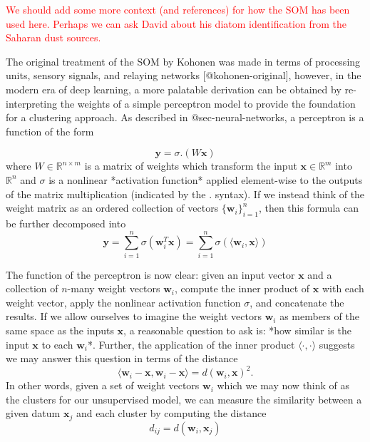 \textcolor{red}{We should add some more context (and references) for how the SOM has been used here. Perhaps we can ask David about his diatom identification from the Saharan dust sources.}

The original treatment of the SOM by Kohonen was made in terms of processing units, sensory signals, and relaying networks [@kohonen-original], however, in the modern era of deep learning, a more palatable derivation can be obtained by re-interpreting the weights of a simple perceptron model to provide the foundation for a clustering approach. As described in @sec-neural-networks, a perceptron is a function of the form

\begin{equation}
    \mathbf{y} = \sigma.\left(W\mathbf{x}\right)
\end{equation}
where $W\in\mathbb{R}^{n\times m}$ is a matrix of weights which transform the input $\mathbf{x}\in\mathbb{R}^m$ into $\mathbb{R}^n$ and $\sigma$ is a nonlinear *activation function* applied element-wise to the outputs of the matrix multiplication (indicated by the $.$ syntax). If we instead think of the weight matrix as an ordered collection of vectors $\{\mathbf{w}_i\}_{i=1}^{n}$, then this formula can be further decomposed into
\begin{equation}
    \mathbf{y} = \sum_{i=1}^n \sigma(\mathbf{w}_i^T\mathbf{x}) = \sum_{i=1}^n \sigma(\langle \mathbf{w}_i, \mathbf{x} \rangle)
\end{equation}

The function of the perceptron is now clear: given an input vector $\mathbf{x}$ and a collection of $n$-many weight vectors $\mathbf{w}_i$, compute the inner product of $\mathbf{x}$ with each weight vector, apply the nonlinear activation function $\sigma$, and concatenate the results. If we allow ourselves to imagine the weight vectors $\mathbf{w}_i$ as members of the same space as the inputs $\mathbf{x}$, a reasonable question to ask is: *how similar is the input $\mathbf{x}$ to each $\mathbf{w}_i$*. Further, the application of the inner product $\langle \cdot,\cdot \rangle$ suggests we may answer this question in terms of the distance
\begin{equation}
    \langle \mathbf{w}_i-\mathbf{x},  \mathbf{w}_i-\mathbf{x}\rangle = d(\mathbf{w}_i, \mathbf{x})^2.
\end{equation}
In other words, given a set of weight vectors $\mathbf{w}_i$ which we may now think of as the clusters for our unsupervised model, we can measure the similarity between a given datum $\mathbf{x}_j$ and each cluster by computing the distance
\begin{equation}
    d_{ij} = d\left(\mathbf{w}_i, \mathbf{x}_j \right)
\end{equation}

